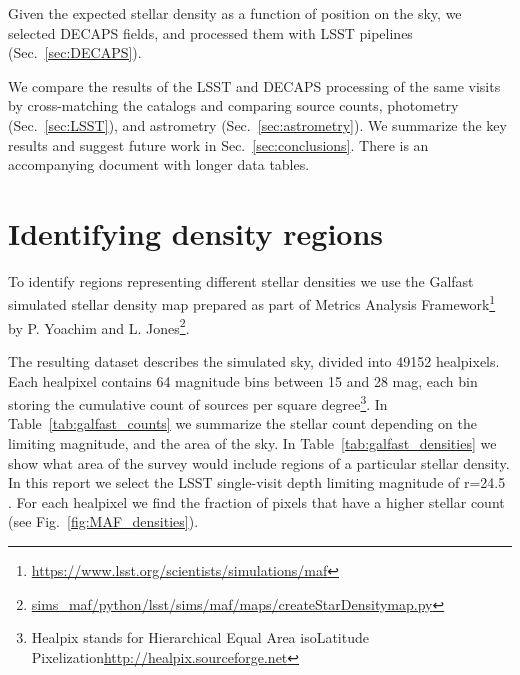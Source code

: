 \documentclass[DM,lsstdraft,toc,usenatbib,authoryear]{lsstdoc}
\begin{document}
Given the expected stellar density as a function of position on the sky, we selected DECAPS fields, and processed them with LSST pipelines (Sec.~\ref{sec:DECAPS}).

We compare the results of the LSST and DECAPS processing of the same visits by cross-matching the catalogs and comparing source counts, photometry (Sec.~\ref{sec:LSST}), and astrometry (Sec.~\ref{sec:astrometry}). We summarize the key results and suggest future work in Sec.~\ref{sec:conclusions}. There is an accompanying document with longer data tables.




\section{Identifying density regions}
\label{sec:MAF}
To identify regions representing different stellar densities we use the Galfast simulated stellar density map
prepared as part of Metrics Analysis Framework\footnote{\url{https://www.lsst.org/scientists/simulations/maf}} by P. Yoachim and L. Jones\footnote{\url{sims_maf/python/lsst/sims/maf/maps/createStarDensitymap.py}}.

The  resulting dataset describes the simulated sky, divided into 49152 healpixels. Each healpixel contains 64 magnitude bins between 15 and 28 mag, each bin storing the cumulative count of sources per square degree\footnote{Healpix stands for Hierarchical Equal Area isoLatitude Pixelization\url{http://healpix.sourceforge.net}\citep{gorski2005}}.  In Table~\ref{tab:galfast_counts} we summarize the stellar count depending on the limiting magnitude, and the area of the sky. In Table~\ref{tab:galfast_densities} we show what area of the survey would include regions of a particular stellar density. In this report  we select the  LSST single-visit depth limiting magnitude of r=24.5 . For each healpixel we find the fraction of pixels that have a higher stellar count (see Fig.~\ref{fig:MAF_densities}).
\end{document}
